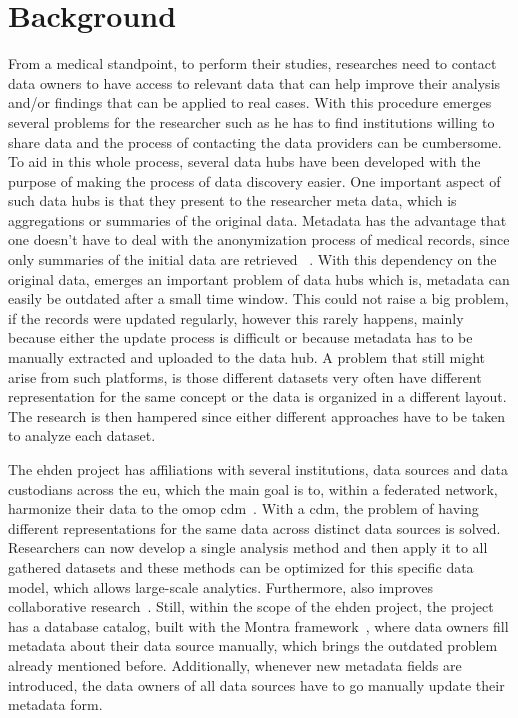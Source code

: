 \chapter{Background}
\label{chapter:background}

From a medical standpoint, to perform their studies, researches need to contact data
owners to have access to relevant data that can help improve their analysis and/or
findings that can be applied to real cases.
With this procedure emerges several problems for the researcher such as he has to find
institutions willing to share data and the process of contacting the data providers can
be cumbersome.
To aid in this whole process, several data hubs have been developed with the purpose of
making the process of data discovery easier.
One important aspect of such data hubs is that they present to the researcher meta
data, which is aggregations or summaries of the original data.
Metadata has the advantage that one doesn't have to deal with the anonymization process
of medical records, since only summaries of the initial data are retrieved
~\cite{egenvar, montra}.
With this dependency on the original data, emerges an important problem of data hubs
which is, metadata can easily be outdated after a small time window.
This could not raise a big problem, if the records were updated regularly, however this
rarely happens, mainly because either the update process is difficult or because
metadata has to be manually extracted and uploaded to the data hub.
A problem that still might arise from such platforms, is those different datasets very
often have different representation for the same concept or the data is organized in a
different layout.
The research is then hampered since either different approaches have to be taken to
analyze each dataset.

The \gls{ehden} project has affiliations with several institutions, data sources and
data custodians across the \gls{eu}, which the main goal is to, within a federated
network, harmonize their data to the \gls{omop} \gls{cdm}~\cite{ehden-datapartners}.
With a \gls{cdm}, the problem of having different representations for the same data
across distinct data sources is solved.
Researchers can now develop a single analysis method and then apply it to all gathered
datasets and these methods can be optimized for this specific data model, which allows
large-scale analytics.
Furthermore, also improves collaborative research~\cite{ohdsi-site}.
Still, within the scope of the \gls{ehden} project, the project has a database catalog,
built with the Montra framework~\cite{montra}, where data owners fill metadata about
their data source manually, which brings the outdated problem already mentioned before.
Additionally, whenever new metadata fields are introduced, the data owners of all data
sources have to go manually update their metadata form.


